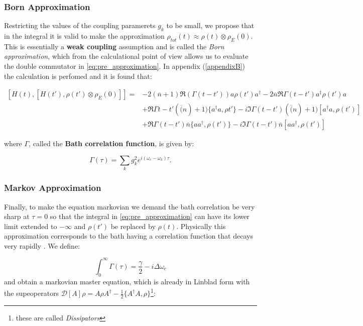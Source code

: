 \subsubsection{Born Approximation}
Restricting the values of the coupling paramerets $g_{k}$ to be small, we propose that in the integral it is valid to make the approximation $\rho_{tot}(t)\approx \rho(t)\otimes\rho_{E}(0)$. This is essentially a \textbf{weak coupling}
assumption and is called the \textit{Born approximation}, which from the calculational point of view allows us to evaluate the double commutator in
\eqref{eq:pre_approximation}. In appendix (\ref{appendixB}) the calculation is perfomed and it is found that:

\begin{equation}
  \begin{split}
    [H(t), [H(t'), \rho(t')\otimes \rho_{E}(0)]] =& -2(\overline{n}+1)\Re{(\Gamma(t-t'))}a\rho(t')a^{\dagger} -2 \overline{n}\Re{\Gamma(t-t')}a^{\dagger}\rho(t')a\\
                                                  &+\Re{\Gamma{t-t'}}(\overline(n)+1)\{a^{\dagger}a, \rho{t'}\} - i\Im{\Gamma(t-t')}(\overline(n)+1)[a^{\dagger}a,\rho(t')]\\
    &+\Re{\Gamma(t-t')}\overline{n}\{aa^{\dagger}, \rho(t')\} -i \Im{\Gamma(t-t')}\overline{n}[aa^{\dagger},\rho(t')]
  \end{split}
\end{equation}

where  $\Gamma$, called the \textbf{Bath correlation function}, is
given by:

\begin{equation}
  \Gamma(\tau) =\sum_{k}g_{k}^{2}e^{i(\omega_{c}-\omega_{k})\tau}\label{eq:bath_correlation}.
\end{equation}

\subsubsection{Markov Approximation}
Finally, to make the equation markovian we demand the bath correlation be very sharp at $\tau=0$ so that the integral in
\eqref{eq:pre_approximation} can have its lower limit extended to $-\infty$ and $\rho(t')$ be replaced by $\rho(t)$. Physically this
approximation corresponds to the bath having a correlation function that decays very rapidly \cite{hornberger2009introduction}. We define:

\begin{equation}
  \int_{0}^{\infty}\Gamma(\tau)=\frac{\gamma}{2} -i \Delta \omega_{c}
\end{equation}
and obtain a markovian master equation, which is already in Linblad form with the supeoperators $\mathcal{D}[A]\rho=A\rho A^{\dagger}-\frac{1}{2}\{A^{\dagger}A,\rho\}$\footnote{these are called \textit{Dissipators}}:

